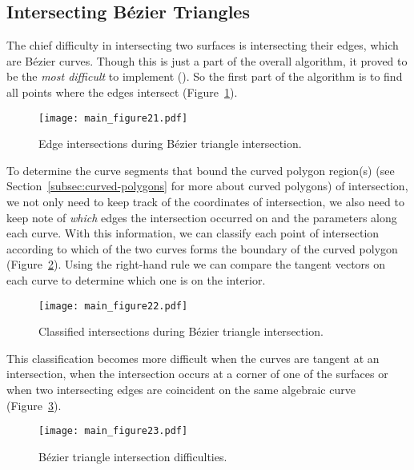 \documentclass[letterpaper,10pt]{article}
\theoremstyle{definition}
\begin{document}
\subsection{Intersecting B\'{e}zier Triangles}\label{subsec:intersect-bez-tri}

The chief difficulty in intersecting two surfaces is intersecting their edges,
which are B\'{e}zier curves.
Though this is just a part of the overall algorithm, it proved to be the
\emph{most difficult} to implement (\cite{Hermes2017}). So the first part
of the algorithm is to find all points
where the edges intersect (Figure~\ref{fig:edge-intersections}).

\begin{figure}
  \texttt{[image: main\_figure21.pdf]}
  \centering
  \captionsetup{width=.75\linewidth}
  \caption{Edge intersections during B\'{e}zier triangle intersection.}
  \label{fig:edge-intersections}
\end{figure}

To determine the curve segments that bound the curved polygon region(s)
(see Section~\ref{subsec:curved-polygons} for more about curved polygons) of
intersection, we not only need to keep track
of the coordinates of intersection, we also need to keep note of
\emph{which} edges the intersection occurred on and the parameters along
each curve.
With this information, we can classify each point of intersection
according to which of the two curves forms the boundary of the
curved polygon (Figure~\ref{fig:intersection-classification}).
Using the right-hand rule we can compare the tangent
vectors on each curve to determine which one is on the interior.

\begin{figure}
  \texttt{[image: main\_figure22.pdf]}
  \centering
  \captionsetup{width=.75\linewidth}
  \caption{Classified intersections during B\'{e}zier triangle intersection.}
  \label{fig:intersection-classification}
\end{figure}

This classification becomes more difficult when the curves
are tangent at an intersection, when the intersection occurs at a corner
of one of the surfaces or when two intersecting edges are coincident
on the same algebraic curve (Figure~\ref{fig:intersection-difficulties}).

\begin{figure}
  \texttt{[image: main\_figure23.pdf]}
  \centering
  \captionsetup{width=.75\linewidth}
  \caption{B\'{e}zier triangle intersection difficulties.}
  \label{fig:intersection-difficulties}
\end{figure}
\end{document}
